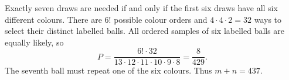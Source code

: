 Exactly seven draws are needed if and only if the first six draws have all six different colours. There are $6!$ possible colour orders and $4\cdot4\cdot2=32$ ways to select their distinct labelled balls. All ordered samples of six labelled balls are equally likely, so
\[
P=\dfrac{6!\cdot32}{13\cdot12\cdot11\cdot10\cdot9\cdot8}
=\dfrac{8}{429}.
\]
The seventh ball must repeat one of the six colours. Thus $m+n=\boxed{437}$.
